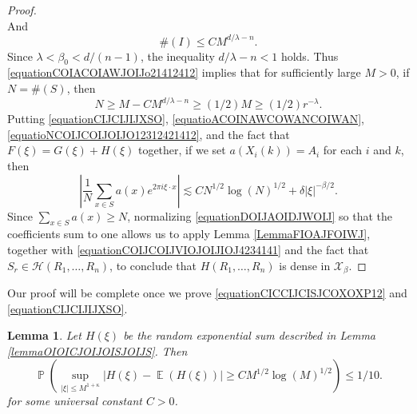 \documentclass[dvipsnames,letterpaper,12pt]{article}
\numberwithin{equation}{section}
\newtheorem{lemma}[theorem]{Lemma}
\numberwithin{theorem}{section}
\DeclareMathOperator{\EE}{\mathbb{E}}
\DeclareMathOperator{\PP}{\mathbb{P}}
\begin{document}
\begin{proof}
\begin{equation}
    \end{equation}
    And
    \begin{equation} \label{equationCOIACOIAWJOIJo21412412}
        \#(I) \leq C M^{d/\lambda - n}.
    \end{equation}
    Since $\lambda < \beta_0 < d/(n-1)$, the inequality $d/\lambda - n < 1$ holds. Thus \eqref{equationCOIACOIAWJOIJo21412412} implies that for sufficiently large $M > 0$, if $N = \#(S)$, then
    \begin{equation} \label{equationCOIJCOIJVIOJOIJIOJ4234141}
        N \geq M - C M^{d/\lambda - n} \geq (1/2) M \geq (1/2) r^{-\lambda}.
    \end{equation}
    Putting \eqref{equationCIJCIJIJXSO}, \eqref{equatioACOINAWCOWANCOIWAN}, \eqref{equatioNCOIJCOIJOIJO12312421412}, and the fact that $F(\xi) = G(\xi) + H(\xi)$ together, if we set $a(X_i(k)) = A_i$ for each $i$ and $k$, then
    \begin{equation} \label{equationDOIJAOIDJWOIJ}
        \left| \frac{1}{N} \sum_{x \in S} a(x) e^{2 \pi i \xi \cdot x} \right| \lesssim C N^{1/2} \log(N)^{1/2} + \delta |\xi|^{-\beta/2}.
    \end{equation}
    Since $\sum_{x \in S} a(x) \geq N$, normalizing \eqref{equationDOIJAOIDJWOIJ} so that the coefficients sum to one allows us to apply Lemma \ref{LemmaFIOAJFOIWJ}, together with \eqref{equationCOIJCOIJVIOJOIJIOJ4234141} and the fact that $S_r \in \mathcal{H}(R_1,\dots,R_n)$, to conclude that $H(R_1,\dots,R_n)$ is dense in $\mathcal{X}_\beta$.
\end{proof}

Our proof will be complete once we prove \eqref{equationCICCIJCISJCOXOXP12} and \eqref{equationCIJCIJIJXSO}.

\begin{lemma} \label{lemma24901401921209}
    Let $H(\xi)$ be the random exponential sum described in Lemma \ref{lemmaOIOICJOIJOISJOIJS}. Then
    \[ \PP \left( \sup_{|\xi| \leq M^{1 + \kappa}} | H(\xi) - \EE(H(\xi)) | \geq C M^{1/2} \log(M)^{1/2} \right) \leq 1/10. \]
    for some universal constant $C > 0$.
\end{lemma}

\end{document}
